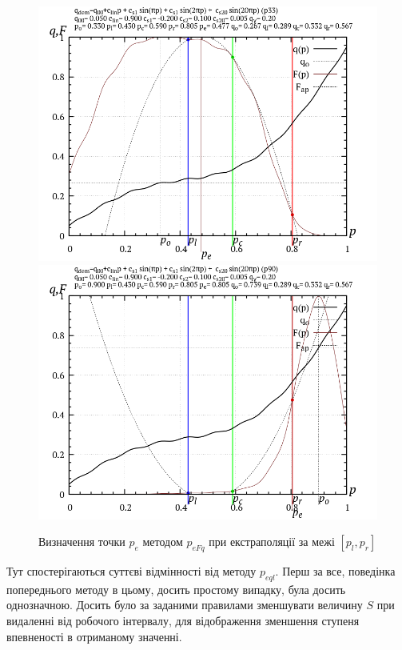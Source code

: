 \begin{figure}[htb!]
  \begin{center}
    \includegraphics[width=49\TW]{p/p_eFq/q_p_eFq_p33.png}
    \hfill
    \includegraphics[width=49\TW]{p/p_eFq/q_p_eFq_p90.png}
  \end{center}
\caption{Визначення точки $ p_e $ методом $ p_{eFq} $ при екстраполяції за межі $ [p_l, p_r] $}
\label{atu:f:p_eFq_extra}
\end{figure}

Тут спостерігаються суттєві відмінності від методу
$p_{eql}$. Перш за все, поведінка попереднього методу в цьому,
досить простому випадку, була досить однозначною. Досить було
за заданими правилами зменшувати величину
$S$ при видаленні від робочого інтервалу, для відображення
зменшення ступеня впевненості в отриманому значенні.

